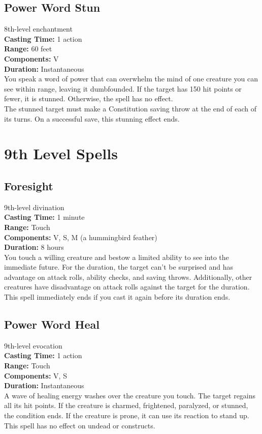 \documentclass[11pt, A4paper, english]{article}
\begin{document}
		\subsection{Power Word Stun}
8th-level enchantment \\
\textbf{Casting Time:} 1 action \\
\textbf{Range:} 60 feet \\
\textbf{Components:} V \\
\textbf{Duration:} Instantaneous \\
You speak a word of power that can overwhelm the mind of one creature you can see within range, leaving it dumbfounded. If the target has 150 hit points or fewer, it is stunned. Otherwise, the spell has no effect. \\
The stunned target must make a Constitution saving throw at the end of each of its turns. On a successful save, this stunning effect ends.



	\section{9th Level Spells}
		\subsection{Foresight}
9th-level divination \\
\textbf{Casting Time:} 1 minute \\
\textbf{Range:} Touch \\
\textbf{Components:} V, S, M (a hummingbird feather) \\
\textbf{Duration:} 8 hours \\
You touch a willing creature and bestow a limited ability to see into the immediate future. For the duration, the target can’t be surprised and has advantage on attack rolls, ability checks, and saving throws. Additionally, other creatures have disadvantage on attack rolls against the target for the duration. \\
This spell immediately ends if you cast it again before its duration ends.

		\subsection{Power Word Heal}
9th-level evocation \\
\textbf{Casting Time:} 1 action \\
\textbf{Range:} Touch \\
\textbf{Components:} V, S \\
\textbf{Duration:} Instantaneous \\
A wave of healing energy washes over the creature you touch. The target regains all its hit points. If the creature is charmed, frightened, paralyzed, or stunned, the condition ends. If the creature is prone, it can use its reaction to stand up. This spell has no effect on undead or constructs.
\end{document}
